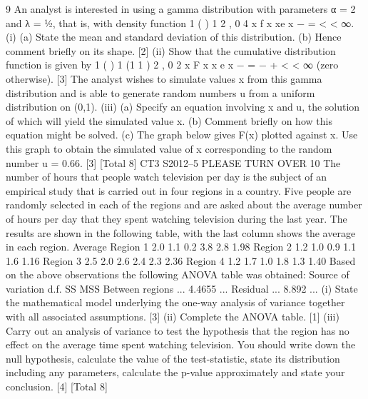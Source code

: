 9 An analyst is interested in using a gamma distribution with parameters α = 2 and
λ = ½, that is, with density function
1
( ) 1 2 , 0
4
x
f x xe x
−
= < < ∞.
(i) (a) State the mean and standard deviation of this distribution.
(b) Hence comment briefly on its shape.
[2]
(ii) Show that the cumulative distribution function is given by
1
( ) 1 (1 1 ) 2 , 0
2
x
F x x e x
−
= − + < < ∞ (zero otherwise). [3]
The analyst wishes to simulate values x from this gamma distribution and is able to
generate random numbers u from a uniform distribution on (0,1).
(iii) (a) Specify an equation involving x and u, the solution of which will yield
the simulated value x.
(b) Comment briefly on how this equation might be solved.
(c) The graph below gives F(x) plotted against x. Use this graph to obtain
the simulated value of x corresponding to the random number u = 0.66.
[3]
[Total 8]
CT3 S2012–5 PLEASE TURN OVER
10 The number of hours that people watch television per day is the subject of an
empirical study that is carried out in four regions in a country. Five people are
randomly selected in each of the regions and are asked about the average number of
hours per day that they spent watching television during the last year. The results are
shown in the following table, with the last column shows the average in each region.
Average
Region 1 2.0 1.1 0.2 3.8 2.8 1.98
Region 2 1.2 1.0 0.9 1.1 1.6 1.16
Region 3 2.5 2.0 2.6 2.4 2.3 2.36
Region 4 1.2 1.7 1.0 1.8 1.3 1.40
Based on the above observations the following ANOVA table was obtained:
  Source of variation d.f. SS MSS
Between regions ... 4.4655 ...
Residual ... 8.892 ...
(i) State the mathematical model underlying the one-way analysis of variance
together with all associated assumptions. [3]
(ii) Complete the ANOVA table. [1]
(iii) Carry out an analysis of variance to test the hypothesis that the region has no
effect on the average time spent watching television. You should write down
the null hypothesis, calculate the value of the test-statistic, state its distribution
including any parameters, calculate the p-value approximately and state your
conclusion. [4]
[Total 8]
  
